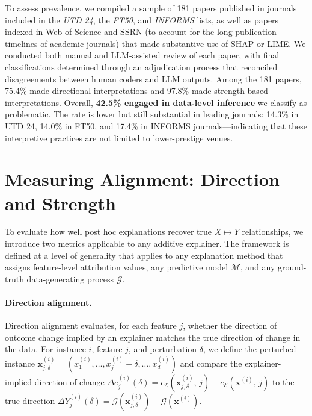 \documentclass[11pt]{article}
\begin{document}
To assess prevalence, we compiled a sample of 181 papers published in journals included in the \textit{UTD 24}, the \textit{FT50}, and \textit{INFORMS} lists, as well as papers indexed in Web of Science and SSRN (to account for the long publication timelines of academic journals) that made substantive use of SHAP or LIME. We conducted both manual and LLM-assisted review of each paper, with final classifications determined through an adjudication process that reconciled disagreements between human coders and LLM outputs. Among the 181 papers, 75.4\% made directional interpretations and 97.8\% made strength-based interpretations. Overall, \textbf{42.5\% engaged in data-level inference} we classify as problematic. The rate is lower but still substantial in leading journals: 14.3\% in UTD 24, 14.0\% in FT50, and 17.4\% in INFORMS journals---indicating that these interpretive practices are not limited to lower-prestige venues. %

\vspace{-0.1cm}
\section{Measuring Alignment: Direction and Strength}
\vspace{-0.1cm}

To evaluate how well post hoc explanations recover true $X \mapsto Y$ relationships, we introduce two metrics applicable to any additive explainer. The framework is defined at a level of generality that applies to any explanation method that assigns feature-level attribution values, any predictive model $\mathcal{M}$, and any ground-truth data-generating process $\mathcal{G}$.

\vspace{-0.5cm}
\paragraph{Direction alignment.}
Direction alignment evaluates, for each feature $j$, whether the direction of outcome change implied by an explainer matches the true direction of change in the data. For instance $i$, feature $j$, and perturbation $\delta$, we define the perturbed instance $\mathbf{x}^{(i)}_{j,\delta} = (x^{(i)}_1, \ldots, x^{(i)}_j + \delta, \ldots, x^{(i)}_d)$ and compare the explainer-implied direction of change $\Delta e^{(i)}_{j}(\delta) = e_{\mathcal{E}}\!\left(\mathbf{x}^{(i)}_{j,\delta},\, j\right) - e_{\mathcal{E}}\!\left(\mathbf{x}^{(i)},\, j\right)$ to the true direction $\Delta Y^{(i)}_{j}(\delta) = \mathcal{G}\!\left(\mathbf{x}^{(i)}_{j,\delta}\right) - \mathcal{G}\!\left(\mathbf{x}^{(i)}\right)$.
\end{document}
